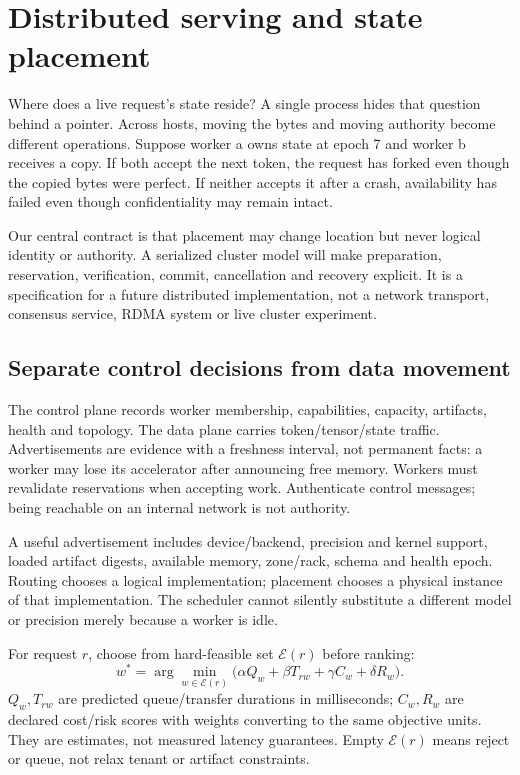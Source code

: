 \chapter{Distributed serving and state placement}
\label{evod46:chapter}

Where does a live request's state reside? A single process hides that question
behind a pointer. Across hosts, moving the bytes and moving authority become
different operations. Suppose worker a owns state at epoch 7 and worker b
receives a copy. If both accept the next token, the request has forked even
though the copied bytes were perfect. If neither accepts it after a crash,
availability has failed even though confidentiality may remain intact.

Our central contract is that placement may change location but never logical
identity or authority. A serialized cluster model will make preparation,
reservation, verification, commit, cancellation and recovery explicit.
It is a specification for a future distributed implementation, not a network
transport, consensus service, RDMA system or live cluster experiment.

\section{Separate control decisions from data movement}
\label{evod46:control}
The control plane records worker membership, capabilities, capacity, artifacts,
health and topology. The data plane carries token/tensor/state traffic.
Advertisements are evidence with a freshness interval, not permanent facts:
a worker may lose its accelerator after announcing free memory. Workers must
revalidate reservations when accepting work. Authenticate control messages;
being reachable on an internal network is not authority.

A useful advertisement includes device/backend, precision and kernel support,
loaded artifact digests, available memory, zone/rack, schema and health epoch.
Routing chooses a logical implementation; placement chooses a physical
instance of that implementation. The scheduler cannot silently substitute a
different model or precision merely because a worker is idle.

For request $r$, choose from hard-feasible set $\mathcal E(r)$ before ranking:
\[
 w^*=\arg\min_{w\in\mathcal E(r)}
 \bigl(\alpha Q_w+\beta T_{rw}+\gamma C_w+\delta R_w\bigr).
\]
$Q_w,T_{rw}$ are predicted queue/transfer durations in milliseconds;
$C_w,R_w$ are declared cost/risk scores with weights converting to the same
objective units. They are estimates, not measured latency guarantees. Empty
$\mathcal E(r)$ means reject or queue, not relax tenant or artifact constraints.

